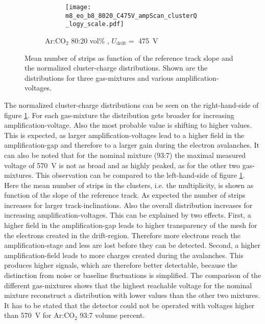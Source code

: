 \documentclass[
twoside,            %
BCOR1.4cm,          %
10pt,               %
headings=normal,    %
headsepline,        %
clearplainpage,		%
final,              %
div=14,
open=right,
bibliography=toc
]{scrreprt}
\begin{document}
\begin{figure}[!h]
\begin{subfigure}[b]{\textwidth}
		\hfill
		\begin{subfigure}[b]{0.48\textwidth}
			\centering
			\texttt{[image: m8\_eo\_b8\_8020\_C475V\_ampScan\_clusterQ\_logy\_scale.pdf]}
		\end{subfigure}
		\caption{
			Ar:CO$_{2}$ 80:20 vol\% , $U_{\mathrm{drift}} = $ \SI{475}{V}
		}
	\end{subfigure}
	\vspace{-4mm}
	\caption{
		Mean number of strips as function of the reference track slope and the normalized cluster-charge distributions.
		Shown are the distributions for three gas-mixtures and various amplification-voltages.
	}
	\label{clusterProperties_gasNampScan} 
\end{figure}

The normalized cluster-charge distributions can be seen on the right-hand-side of figure \ref{clusterProperties_gasNampScan}.
For each gas-mixture the distribution gets broader for increasing amplification-voltage.
Also the most probable value is shifting to higher values.
This is expected, as larger amplification-voltages lead to a higher field in the amplification-gap and therefore to a larger gain during the electron avalanches.
It can also be noted that for the nominal mixture (93:7) the maximal measured voltage of \SI{570}{V} is not as broad and as highly peaked, as for the other two gas-mixtures.
This observation can be compared to the left-hand-side of figure \ref{clusterProperties_gasNampScan}.
Here the mean number of strips in the clusters, i.e. the multiplicity, is shown as function of the slope of the reference track.
As expected the number of strips increases for larger track-inclinations.
Also the overall distribution increases for increasing amplification-voltages.
This can be explained by two effects.
First, a higher field in the amplification-gap leads to higher transparency of the mesh for the electrons created in the drift-region.
Therefore more electrons reach the amplification-stage and less are lost before they can be detected.
Second, a higher amplification-field leads to more charges created during the avalanches.
This produces higher signals, which are therefore better detectable, because the distinction from noise or baseline fluctuations is simplified.
The comparison of the different gas-mixtures shows that the highest reachable voltage for the nominal mixture reconstruct a distribution with lower values than the other two mixtures.
It has to be stated that the detector could not be operated with voltages higher than \SI{570}{V} for Ar:CO$_{2}$ 93:7 volume percent.
\end{document}

